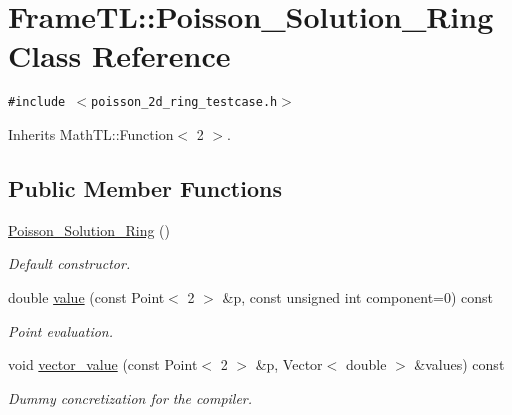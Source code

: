 \hypertarget{classFrameTL_1_1Poisson__Solution__Ring}{
\section{FrameTL::Poisson\_\-Solution\_\-Ring Class Reference}
\label{classFrameTL_1_1Poisson__Solution__Ring}
}
{\tt \#include $<$poisson\_\-2d\_\-ring\_\-testcase.h$>$}

Inherits MathTL::Function$<$ 2 $>$.

\subsection*{Public Member Functions}
\begin{CompactItemize}
\item 
\hypertarget{classFrameTL_1_1Poisson__Solution__Ring_9340b045bf0587df6fdc00d7178da302}{
\hyperlink{classFrameTL_1_1Poisson__Solution__Ring_9340b045bf0587df6fdc00d7178da302}{Poisson\_\-Solution\_\-Ring} ()}
\label{classFrameTL_1_1Poisson__Solution__Ring_9340b045bf0587df6fdc00d7178da302}

\begin{CompactList}\small\item\em Default constructor. \item\end{CompactList}\item 
\hypertarget{classFrameTL_1_1Poisson__Solution__Ring_e3fe20619f5529f16fb8d87fe69a860a}{
double \hyperlink{classFrameTL_1_1Poisson__Solution__Ring_e3fe20619f5529f16fb8d87fe69a860a}{value} (const Point$<$ 2 $>$ \&p, const unsigned int component=0) const }
\label{classFrameTL_1_1Poisson__Solution__Ring_e3fe20619f5529f16fb8d87fe69a860a}

\begin{CompactList}\small\item\em Point evaluation. \item\end{CompactList}\item 
\hypertarget{classFrameTL_1_1Poisson__Solution__Ring_2812e1050226b015a28b32b9ef37e0e3}{
void \hyperlink{classFrameTL_1_1Poisson__Solution__Ring_2812e1050226b015a28b32b9ef37e0e3}{vector\_\-value} (const Point$<$ 2 $>$ \&p, Vector$<$ double $>$ \&values) const }
\label{classFrameTL_1_1Poisson__Solution__Ring_2812e1050226b015a28b32b9ef37e0e3}

\begin{CompactList}\small\item\em Dummy concretization for the compiler. \item\end{CompactList}\end{CompactItemize}


